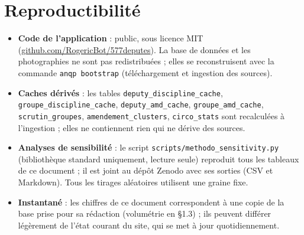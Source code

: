 \documentclass[11pt,a4paper]{article}
\newcommand{\code}[1]{\texttt{\small #1}}
\begin{document}
\section{Reproductibilité}\label{sec:repro}
\begin{itemize}
  \item \textbf{Code de l'application} : public, sous licence MIT
        (\href{https://github.com/RogericBot/577deputes}{github.com/RogericBot/577deputes}).
        La base de données et les photographies ne sont pas redistribuées ; elles se
        reconstruisent avec la commande \code{anqp bootstrap} (téléchargement et
        ingestion des sources).
  \item \textbf{Caches dérivés} : les tables \code{deputy\_discipline\_cache},
        \code{groupe\_discipline\_cache}, \code{deputy\_amd\_cache},
        \code{groupe\_amd\_cache}, \code{scrutin\_groupes}, \code{amendement\_clusters},
        \code{circo\_stats} sont recalculées à l'ingestion ; elles ne contiennent
        rien qui ne dérive des sources.
  \item \textbf{Analyses de sensibilité} : le script \code{scripts/methodo\_sensitivity.py}
        (bibliothèque standard uniquement, lecture seule) reproduit tous les
        tableaux de ce document ; il est joint au dépôt Zenodo avec ses sorties
        (CSV et Markdown). Tous les tirages aléatoires utilisent une graine fixe.
  \item \textbf{Instantané} : les chiffres de ce document correspondent à une copie
        de la base prise pour sa rédaction (volumétrie en §1.3) ; ils peuvent
        différer légèrement de l'état courant du site, qui se met à jour
        quotidiennement.
\end{itemize}
\end{document}
